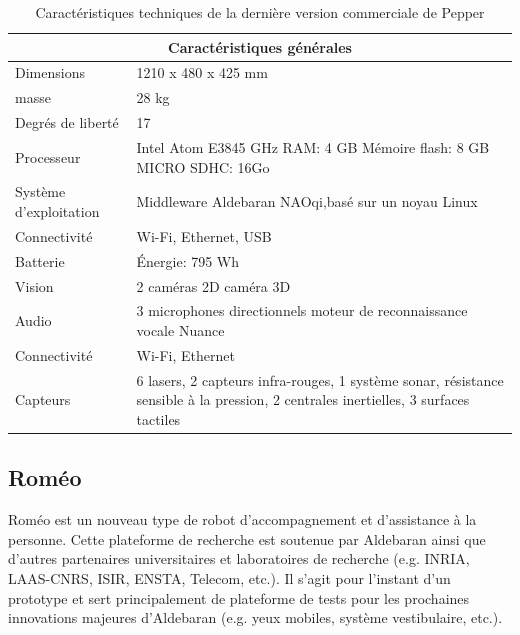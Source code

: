 \begin{table}[h]
\begin{tabular}{ | l | p{10cm} | }
	\hline
	\multicolumn{2}{|c|}{Caractéristiques générales} \\
	\hline
	Dimensions & 1210 x 480 x 425 mm \\
	\hline 
	masse & 28 kg \\
	\hline 
	Degrés de liberté  & 17 \\
	\hline
	Processeur & Intel Atom E3845 \newline 1.91 GHz \newline RAM: 4 GB \newline Mémoire flash: 8 GB \newline MICRO SDHC: 16Go  \\
	\hline
	Système d'exploitation & Middleware Aldebaran NAOqi,\newline basé sur un noyau Linux \\
	\hline
	Connectivité & Wi-Fi, Ethernet, USB \\
	\hline
	Batterie & Énergie: 795 Wh \\
	\hline 
	Vision & 2 caméras 2D \newline 1 caméra 3D \\
	\hline
	Audio & 3 microphones directionnels \newline moteur de reconnaissance vocale Nuance  \\
	\hline
	Connectivité & Wi-Fi, Ethernet \\
	\hline
	Capteurs & 6 lasers, 2 capteurs infra-rouges, 1 système sonar, résistance sensible à la pression, 2 centrales inertielles, 3 surfaces tactiles \\
	\hline
\end{tabular}
\caption[Caractéristiques technique de Pepper]{Caractéristiques techniques de la dernière version commerciale  de Pepper}
\label {tab: Caractéristiques technique de Pepper}
\cite{PepperTech}
\end{table}

\subsection{Roméo}
\label{Entreprise: Les produits: Roméo}
Roméo est un nouveau type de robot d'accompagnement et d'assistance à la personne. Cette plateforme de recherche est soutenue par Aldebaran ainsi que d'autres partenaires universitaires et laboratoires de recherche (e.g. INRIA, LAAS-CNRS, ISIR, ENSTA, Telecom, etc.). Il s'agit pour l'instant d'un prototype et sert principalement de plateforme de tests pour les prochaines innovations majeures d'Aldebaran (e.g. yeux mobiles, système vestibulaire, etc.). 

